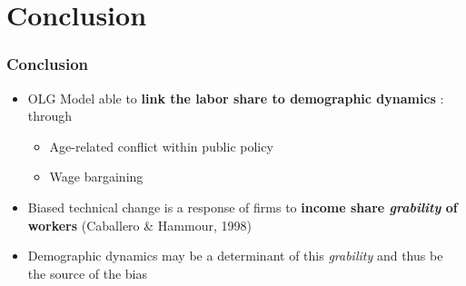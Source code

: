 \documentclass{beamer}
\begin{document}
	\section{Conclusion}
		\begin{frame}\frametitle{Conclusion}
			\begin{itemize}
				\item OLG Model able to \textbf{link the labor share to demographic dynamics} : through
				\begin{itemize}
					\item Age-related conflict within public policy
					\item Wage bargaining
				\end{itemize}
				\vspace{1em}
				\item Biased technical change is a response of firms to \textbf{income share \textit{grability} of workers} {\footnotesize (Caballero \& Hammour, 1998)}
				\item Demographic dynamics may be a determinant of this \textit{grability} and thus be the source of the bias
			\end{itemize}
		\end{frame}

	\appendix
\end{document}
